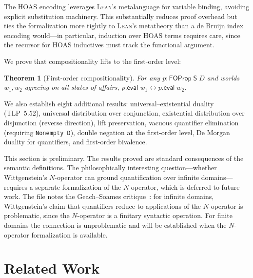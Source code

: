 \documentclass[10pt, letterpaper]{article}
\newtheorem{theorem}{Theorem}[section]
\theoremstyle{definition}
\theoremstyle{remark}
\newcommand{\Sach}{\mathsf{S}}
\newcommand{\eval}{\mathsf{eval}}
\newcommand{\Lean}{\textsc{Lean}}
\begin{document}
\noindent
The HOAS encoding leverages \Lean's metalanguage for variable
binding, avoiding explicit substitution machinery.  This
substantially reduces proof overhead but ties the formalization
more tightly to \Lean's metatheory than a de Bruijn index
encoding would---in particular, induction over HOAS terms
requires care, since the recursor for HOAS inductives must track
the functional argument.

We prove that compositionality lifts to the first-order level:

\begin{theorem}[First-order compositionality]
\label{thm:fo-comp}
For any $p : \mathsf{FOProp}\;\Sach\;D$ and worlds $w_1, w_2$
agreeing on all states of affairs, $p.\eval\;w_1 \leftrightarrow
p.\eval\;w_2$.
\end{theorem}

\noindent
We also establish eight additional results: universal--existential
duality (TLP~5.52), universal distribution over conjunction,
existential distribution over disjunction (reverse direction),
lift preservation, vacuous quantifier elimination (requiring
\texttt{Nonempty D}), double negation at the first-order level,
De Morgan duality for quantifiers, and first-order bivalence.

This section is preliminary.  The results proved are standard
consequences of the semantic definitions.  The philosophically
interesting question---whether Wittgenstein's $N$-operator can
ground quantification over infinite domains---requires a
separate formalization of the $N$-operator, which is deferred to
future work.  The file notes the
Geach--Soames critique~\cite{geach1981,soames1983}: for infinite
domains, Wittgenstein's claim that quantifiers reduce to
applications of the $N$-operator is problematic, since the
$N$-operator is a finitary syntactic operation.  For finite
domains the connection is unproblematic and will be established
when the $N$-operator formalization is available.

\section{Related Work}
\label{sec:related}
\end{document}

